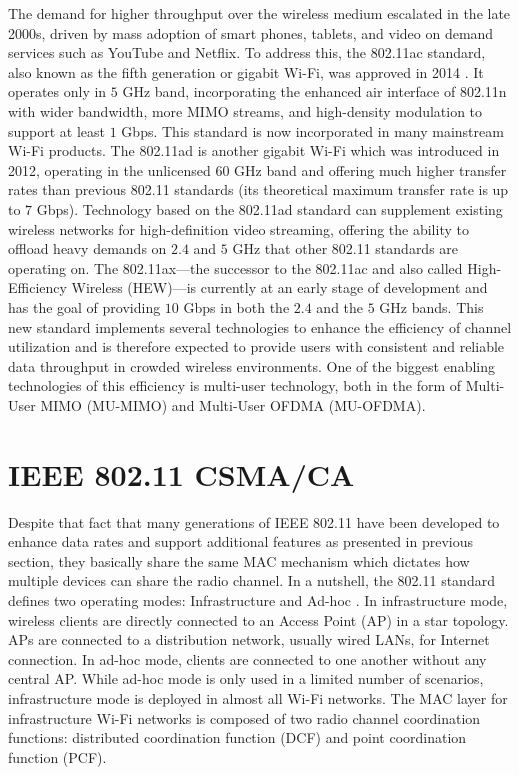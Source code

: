 The demand for higher throughput over the wireless medium escalated in the late 2000s, driven by mass adoption of smart phones, tablets, and video on demand services such as YouTube and Netflix. To address this, the 802.11ac standard, also known as the fifth generation or gigabit \mbox{Wi-Fi}, was approved in 2014 \cite{80211ac}. It operates only in $5$ GHz band, incorporating the enhanced air interface of 802.11n with wider bandwidth, more MIMO streams, and high-density modulation to support at least $1$ Gbps. This standard is now incorporated in many mainstream \mbox{Wi-Fi} products. The 802.11ad is another gigabit \mbox{Wi-Fi} which was introduced in 2012, operating in the unlicensed $60$ GHz band and offering much higher transfer rates than previous 802.11 standards (its theoretical maximum transfer rate is up to $7$ Gbps). Technology based on the 802.11ad standard can supplement existing wireless networks for high-definition video streaming, offering the ability to offload heavy demands on $2.4$ and $5$ GHz that other 802.11 standards are operating on. The 802.11ax---the successor to the 802.11ac and also called  High-Efficiency Wireless (HEW)---is currently at an early stage of development and has the goal of providing $10$ Gbps in both the $2.4$ and the $5$ GHz bands. This new standard implements several technologies to enhance the efficiency of channel utilization and is therefore expected to provide users with consistent and reliable data throughput in crowded wireless environments. One of the biggest enabling technologies of this efficiency is multi-user technology, both in the form of Multi-User MIMO (MU-MIMO) and Multi-User OFDMA (MU-OFDMA).


\section{IEEE 802.11 CSMA/CA}
\label{csma}

Despite that fact that many generations of IEEE 802.11 have been developed to enhance data rates and support additional features as presented in previous section, they basically share the same MAC mechanism which dictates how multiple devices can share the radio channel. In a nutshell, the 802.11 standard defines two operating modes: Infrastructure and Ad-hoc \cite{80211}. In infrastructure mode, wireless clients are directly connected to an Access Point (AP) in a star topology. APs are connected to a distribution network, usually wired LANs, for Internet connection. In ad-hoc mode, clients are connected to one another without any central AP. While ad-hoc mode is only used in a limited number of scenarios, infrastructure mode is deployed in almost all \mbox{Wi-Fi} networks. The MAC layer for  infrastructure \mbox{Wi-Fi} networks is composed of two radio channel coordination functions: distributed coordination function (DCF) and point coordination function (PCF).

